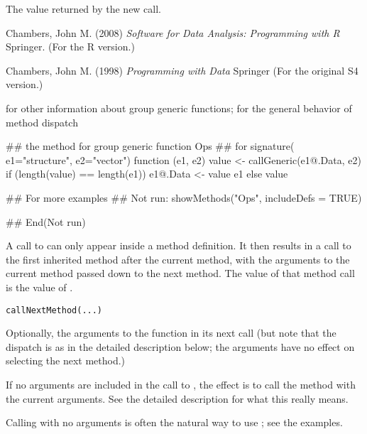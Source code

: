 %
\begin{Value}
The value returned by the new call.
\end{Value}
%
\begin{References}\relax
Chambers, John M. (2008)
\emph{Software for Data Analysis: Programming with R}
Springer.  (For the R version.)

Chambers, John M. (1998)
\emph{Programming with Data}
Springer (For the original S4 version.)
\end{References}
%
\begin{SeeAlso}\relax
{} for other information
about group generic functions;  for the general behavior
of method dispatch
\end{SeeAlso}
%
\begin{Examples}
\begin{ExampleCode}
## the method for group generic function Ops
## for signature( e1="structure", e2="vector")
function (e1, e2)
{
    value <- callGeneric(e1@.Data, e2)
    if (length(value) == length(e1)) {
        e1@.Data <- value
        e1
    }
    else value
}

## For more examples
## Not run: 
showMethods("Ops", includeDefs = TRUE)

## End(Not run)

\end{ExampleCode}
\end{Examples}
%
\begin{Description}\relax
A call to  can only appear inside a method
definition.  It then results in a call to the first inherited method
after the current method, with the arguments to the current method
passed down to the next method.  The value of that method call is the
value of .
\end{Description}
%
\begin{Usage}
\begin{verbatim}
callNextMethod(...)
\end{verbatim}
\end{Usage}
%
\begin{Arguments}
\begin{ldescription}
\item[\code{...}] 
Optionally, the arguments to the function in its next call
(but note that the dispatch is as in the detailed description below;
the arguments have no effect on selecting the next method.)

If no arguments are included in the call to , the
effect is to call the method with the current arguments.
See the detailed description for what this really means.

Calling with no arguments is often the natural way to use
; see the examples.

\end{ldescription}
\end{Arguments}

